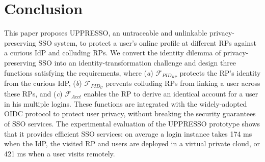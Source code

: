 \section{Conclusion}
\label{sec:conclusion}
This paper proposes UPPRESSO, an untraceable and unlinkable privacy-preserving SSO system,
 to protect a user's online profile at different RPs against a curious IdP and colluding RPs.
We convert the identity dilemma of privacy-preserving SSO into an identity-transformation challenge
 and design three functions satisfying the requirements,
 where (\emph{a}) $\mathcal{F}_{PID_{RP}}$ protects the RP's identity from the curious IdP,
(\emph{b})  $\mathcal{F}_{PID_{U}}$ prevents colluding RPs from linking a user across these RPs,
 and (\emph{c}) $\mathcal{F}_{Acct}$ enables the RP to derive an identical account for a user in his multiple logins.
These functions are integrated with the widely-adopted OIDC protocol
    to protect user privacy,
    without breaking the security guarantees of SSO services.
The experimental evaluation of the UPPRESSO prototype shows
 that it provides efficient SSO services:
  on average a login instance takes 174 ms when the IdP, the visited RP and users are deployed in a virtual private cloud, or 421 ms when a user visits remotely.



\newpage
